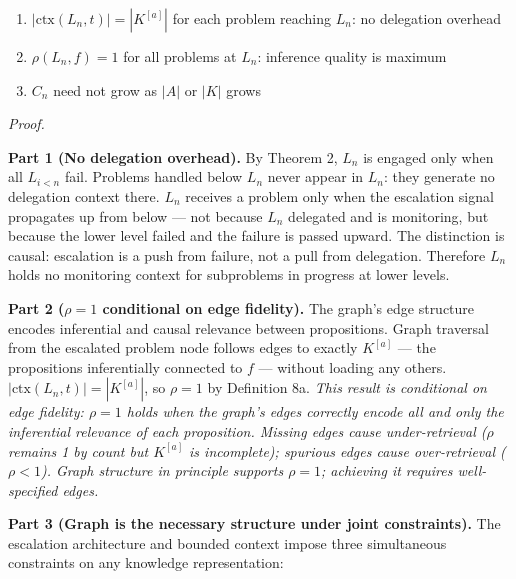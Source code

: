 \documentclass[
]{article}
\providecommand{\tightlist}{%
  \setlength{\itemsep}{0pt}\setlength{\parskip}{0pt}}
\begin{document}
\begin{enumerate}
\def\labelenumi{\arabic{enumi}.}
\tightlist
\item
  \(|\text{ctx}(L_n, t)| = |K^{[a]}|\) for each problem reaching
  \(L_n\): no delegation overhead
\item
  \(\rho(L_n, f) = 1\) for all problems at \(L_n\): inference quality is
  maximum
\item
  \(C_n\) need not grow as \(|A|\) or \(|K|\) grows
\end{enumerate}

\emph{Proof.}

\textbf{Part 1 (No delegation overhead).} By Theorem 2, \(L_n\) is
engaged only when all \(L_{i < n}\) fail. Problems handled below \(L_n\)
never appear in \(L_n\): they generate no delegation context there.
\(L_n\) receives a problem only when the escalation signal propagates up
from below --- not because \(L_n\) delegated and is monitoring, but
because the lower level failed and the failure is passed upward. The
distinction is causal: escalation is a push from failure, not a pull
from delegation. Therefore \(L_n\) holds no monitoring context for
subproblems in progress at lower levels.

\textbf{Part 2 (\(\rho = 1\) conditional on edge fidelity).} The graph's
edge structure encodes inferential and causal relevance between
propositions. Graph traversal from the escalated problem node follows
edges to exactly \(K^{[a]}\) --- the propositions inferentially
connected to \(f\) --- without loading any others.
\(|\text{ctx}(L_n, t)| = |K^{[a]}|\), so \(\rho = 1\) by Definition 8a.
\emph{This result is conditional on edge fidelity: \(\rho = 1\) holds
when the graph's edges correctly encode all and only the inferential
relevance of each proposition. Missing edges cause under-retrieval
(\(\rho\) remains 1 by count but \(K^{[a]}\) is incomplete); spurious
edges cause over-retrieval (\(\rho < 1\)). Graph structure in principle
supports \(\rho = 1\); achieving it requires well-specified edges.}

\textbf{Part 3 (Graph is the necessary structure under joint
constraints).} The escalation architecture and bounded context impose
three simultaneous constraints on any knowledge representation:
\end{document}
